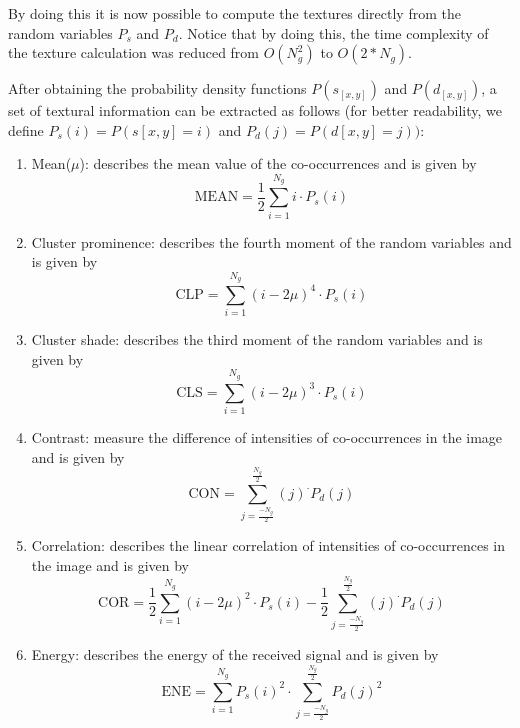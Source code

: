 By doing this it is now possible to compute the textures directly from the random variables $P_s$ and $P_d$. Notice that by doing this, the time 
complexity of the texture calculation was reduced from $O(N_g^2)$ to $O(2*N_g)$.

After obtaining the probability density functions $P(s_{[x,y]})$ and $P(d_{[x,y]})$, a set of textural information can be extracted as follows (for better readability, we define $P_s(i) = P(s[x,y] = i)$ and $P_d(j) = P(d[x,y] = j))$:
\begin{enumerate}
    \item Mean($\mu$): describes the mean value of the co-occurrences and is given by
    \begin{equation}
        \textrm{MEAN} = \frac{1}{2}\sum_{i=1}^{N_g}i\cdot P_s(i)
    \end{equation}
    
    \item Cluster prominence: describes the fourth moment of the random variables and is given by
    \begin{equation}
        \textrm{CLP} = \sum_{i=1}^{N_g}(i-2\mu)^4\cdot P_s(i)
    \end{equation}
    
    \item Cluster shade: describes the third moment of the random variables and is given by
    \begin{equation}
        \textrm{CLS} = \sum_{i=1}^{N_g}(i-2\mu)^3\cdot P_s(i)
    \end{equation}
    
    \item Contrast: measure the difference of intensities of co-occurrences in the image and is given by
    \begin{equation}
        \textrm{CON} = \sum_{j=\frac{-N_g}{2}}^{\frac{N_g}{2}}(j)^\cdot P_d(j)
    \end{equation}
    
    \item Correlation: describes the linear correlation of intensities of co-occurrences in the image and is given by
    \begin{equation}
        \textrm{COR} = \frac{1}{2}\sum_{i=1}^{N_g}(i-2\mu)^2\cdot P_s(i)-\frac{1}{2}\sum_{j=\frac{-N_g}{2}}^{\frac{N_g}{2}}(j)^\cdot P_d(j)
    \end{equation}
    
    \item Energy: describes the energy of the received signal and is given by
    \begin{equation}
        \textrm{ENE} = \sum_{i=1}^{N_g}P_s(i)^2\cdot \sum_{j=\frac{-N_g}{2}}^{\frac{N_g}{2}} P_d(j)^2
    \end{equation}
    

\end{enumerate}
